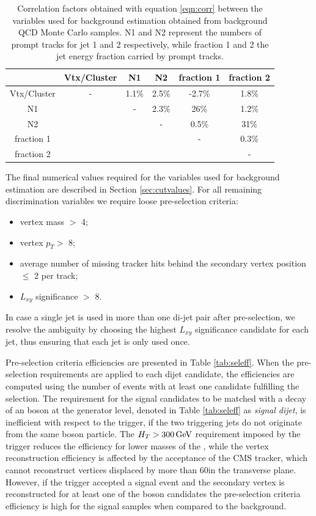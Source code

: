 \begin{table}[htbp]
\centering
\caption{Correlation factors obtained with equation \ref{eqn:corr} between the variables 
used for background estimation obtained from background QCD Monte
Carlo samples. N1 and N2 represent the numbers
of prompt tracks for jet 1 and 2 respectively, while fraction 1 and 2 the jet energy fraction carried by 
prompt tracks.
\label{tab:corr}}
\begin{tabular}{c|ccccc}
 & Vtx/Cluster & N1 & N2 & fraction 1 & fraction 2 \\
\hline
Vtx/Cluster & - & 1.1\% & 2.5\% & -2.7\% & 1.8\%  \\
N1 & & - & 2.3\% & 26\%  & 1.2\% \\
N2 & & & - & 0.5\% & 31\% \\
fraction 1 & & & & - & 0.3\% \\
fraction 2 & & & & & - \\
\end{tabular}
\end{table}

The final numerical values required for the variables used for background estimation are described in Section 
\ref{sec:cutvalues}. For all remaining discrimination variables we require loose pre-selection criteria:   
\begin{itemize}
 \item vertex mass $>$ 4\GeV;
 \item vertex $p_T>$ 8\GeV;
 \item average number of missing tracker hits behind the secondary vertex position $\leq$ 2 per track;
 \item $L_{xy}$ significance $>$ 8.
\end{itemize}

In case a single jet is used in more than one di-jet pair after pre-selection, we resolve
the ambiguity by choosing the highest $L_{xy}$ significance candidate for each jet, thus ensuring that
each jet is only used once. 

Pre-selection criteria efficiencies are presented in Table \ref{tab:seleff}.  
When the pre-selection requirements are applied to each dijet candidate,
the efficiencies are computed using the number of events with at least one candidate fulfilling the selection.
The requirement for the signal candidates to be matched with a decay of an \X boson at the generator level,
 denoted in Table \ref{tab:seleff} as {\it signal dijet}, 
is inefficient with respect to the trigger, if the two triggering
jets do not originate from the same \X boson particle.  
The $H_T>300\,\text{Ge\hspace{-.08em}V}$ requirement imposed by the trigger reduces the efficiency for lower masses of the \Higgs, 
while the vertex reconstruction efficiency is affected by the acceptance of the CMS tracker, which cannot 
reconstruct vertices displaced by more than 60\cm in the transverse plane. However, if the trigger accepted a signal event and the secondary vertex is reconstructed
for at least one of the \X boson candidates the pre-selection criteria efficiency is high for the signal samples
when compared to the background.   

